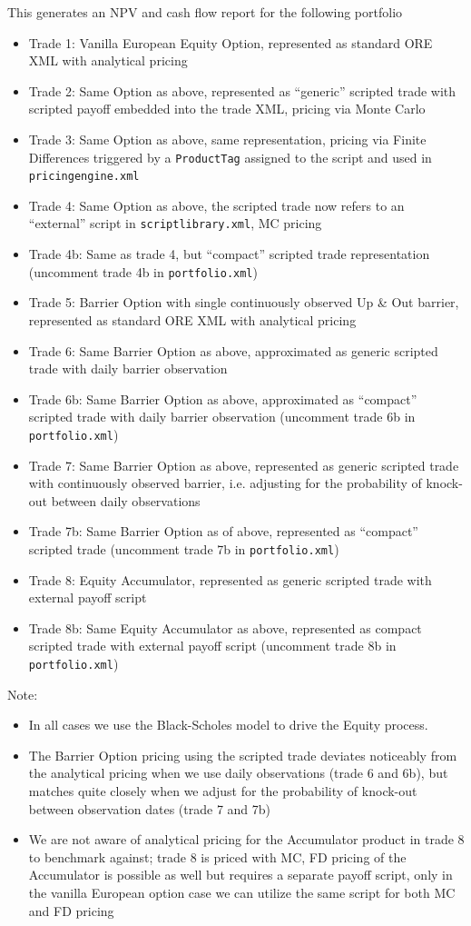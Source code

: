 This generates an NPV and cash flow report for the following portfolio
\begin{itemize}
\item Trade 1: Vanilla European Equity Option, represented as standard ORE XML with analytical pricing
\item Trade 2: Same Option as above, represented as ``generic'' scripted trade with scripted payoff embedded into the trade XML,
  pricing via Monte Carlo
\item Trade 3: Same Option as above, same representation, pricing via Finite Differences triggered by a {\tt ProductTag} assigned
  to the script and used in {\tt pricingengine.xml} 
\item Trade 4: Same Option as above, the scripted trade now refers to an ``external'' script in {\tt scriptlibrary.xml},
  MC pricing
\item Trade 4b: Same as trade 4, but ``compact'' scripted trade representation (uncomment trade 4b in {\tt portfolio.xml})
\item Trade 5: Barrier Option with single continuously observed Up \& Out barrier, represented as standard ORE XML with
  analytical pricing
\item Trade 6: Same Barrier Option as above, approximated as generic scripted trade with daily barrier observation
\item Trade 6b: Same Barrier Option as above, approximated as ``compact'' scripted trade with daily barrier observation
  (uncomment trade 6b in {\tt portfolio.xml})
\item Trade 7: Same Barrier Option as above, represented as generic scripted trade with continuously observed barrier,
  i.e. adjusting for the probability of knock-out between daily observations
\item Trade 7b: Same Barrier Option as of above, represented as ``compact'' scripted trade
  (uncomment trade 7b in {\tt portfolio.xml})
\item Trade 8: Equity Accumulator, represented as generic scripted trade with external payoff script
\item Trade 8b: Same Equity Accumulator as above, represented as compact scripted trade with external payoff script
  (uncomment trade 8b in {\tt portfolio.xml})
\end{itemize}

Note:
\begin{itemize}
\item In all cases we use the Black-Scholes model to drive the Equity process.
\item The Barrier Option pricing using the scripted trade deviates noticeably from the analytical pricing when we use daily
  observations (trade 6 and 6b), but matches quite closely when we adjust for the probability of knock-out between observation
  dates (trade 7 and 7b)
\item We are not aware of analytical pricing for the Accumulator product in trade 8 to benchmark against; trade 8 is priced with MC,
  FD pricing of the Accumulator is possible as well but requires a separate payoff script, only in the vanilla European option case
  we can utilize the same script for both MC and FD pricing
\end{itemize}

